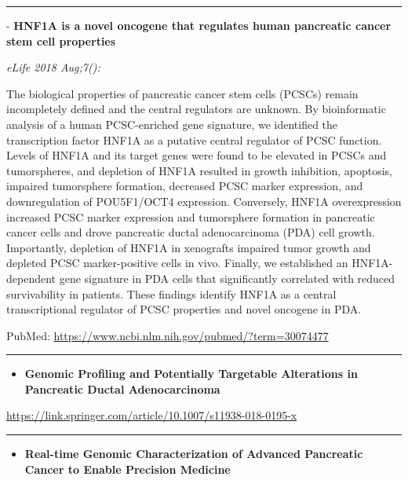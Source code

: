 \documentclass[]{article}
\providecommand{\tightlist}{%
  \setlength{\itemsep}{0pt}\setlength{\parskip}{0pt}}
\begin{document}
{}

\begin{center}\rule{0.5\linewidth}{\linethickness}\end{center}

 - \textbf{HNF1A is a novel oncogene that regulates human pancreatic
cancer stem cell properties}

\emph{eLife 2018 Aug;7():}

The biological properties of pancreatic cancer stem cells (PCSCs) remain
incompletely defined and the central regulators are unknown. By
bioinformatic analysis of a human PCSC-enriched gene signature, we
identified the transcription factor HNF1A as a putative central
regulator of PCSC function. Levels of HNF1A and its target genes were
found to be elevated in PCSCs and tumorspheres, and depletion of HNF1A
resulted in growth inhibition, apoptosis, impaired tumorsphere
formation, decreased PCSC marker expression, and downregulation of
POU5F1/OCT4 expression. Conversely, HNF1A overexpression increased PCSC
marker expression and tumorsphere formation in pancreatic cancer cells
and drove pancreatic ductal adenocarcinoma (PDA) cell growth.
Importantly, depletion of HNF1A in xenografts impaired tumor growth and
depleted PCSC marker-positive cells in vivo. Finally, we established an
HNF1A-dependent gene signature in PDA cells that significantly
correlated with reduced survivability in patients. These findings
identify HNF1A as a central transcriptional regulator of PCSC properties
and novel oncogene in PDA.

PubMed: \url{https://www.ncbi.nlm.nih.gov/pubmed/?term=30074477}

{}

{}

\begin{center}\rule{0.5\linewidth}{\linethickness}\end{center}

\begin{itemize}
\tightlist
\item
  \textbf{Genomic Profiling and Potentially Targetable Alterations in
  Pancreatic Ductal Adenocarcinoma}
\end{itemize}

\url{https://link.springer.com/article/10.1007/s11938-018-0195-x}

\begin{center}\rule{0.5\linewidth}{\linethickness}\end{center}

\begin{itemize}
\tightlist
\item
  \textbf{Real-time Genomic Characterization of Advanced Pancreatic
  Cancer to Enable Precision Medicine}
\end{itemize}
\end{document}
